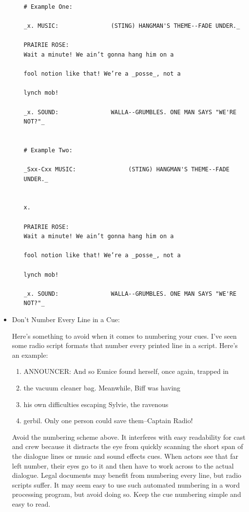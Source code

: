 \documentclass[openleft,oneside,showtrims]{memoir}
\begin{document}
\begin{itemize}
\begin{itemize}
\begin{lstlisting}
# Example One: 

_x. MUSIC:               (STING) HANGMAN'S THEME--FADE UNDER._

PRAIRIE ROSE:
Wait a minute! We ain’t gonna hang him on a
  
fool notion like that! We’re a _posse_, not a 
  
lynch mob! 

_x. SOUND:               WALLA--GRUMBLES. ONE MAN SAYS "WE'RE NOT?"_


# Example Two:

_Sxx-Cxx MUSIC:               (STING) HANGMAN'S THEME--FADE UNDER._


x.

PRAIRIE ROSE:
Wait a minute! We ain’t gonna hang him on a
  
fool notion like that! We’re a _posse_, not a 
  
lynch mob! 

_x. SOUND:               WALLA--GRUMBLES. ONE MAN SAYS "WE'RE NOT?"_

\end{lstlisting}
\end{itemize}

\item Don't Number Every Line in a Cue:
\label{sec:org58dc86c}

Here's something to avoid when it comes to numbering your cues. I've seen some radio script formats that number every printed line in a script. Here's an example:

\begin{enumerate}
\item ANNOUNCER:        And so Eunice found herself, once again, trapped in
\item the vacuum cleaner bag. Meanwhile, Biff was having
\item his own difficulties escaping Sylvie, the ravenous
\item gerbil. Only one person could save them--Captain Radio!
\end{enumerate}

Avoid the numbering scheme above. It interferes with easy readability for cast and crew because it distracts the eye from quickly scanning the short span of the dialogue lines or music and sound effects cues. When actors see that far left number, their eyes go to it and then have to work across to the actual dialogue. Legal documents may benefit from numbering every line, but radio scripts suffer. It may seem easy to use such automated numbering in a word processing program, but avoid doing so. Keep the cue numbering simple and easy to read.


\end{itemize}
\end{document}
